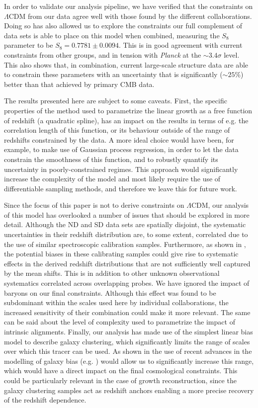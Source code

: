 \documentclass[a4paper,11pt]{article}
\newcommand{\lcdm}{$\Lambda$CDM\xspace}
\newcommand{\planck}{{\sl Planck}\xspace}
\newcommand{\northd}{ND\xspace}
\newcommand{\southd}{SD\xspace}
\begin{document}
    In order to validate our analysis pipeline, we have verified that the constraints on \lcdm from our data agree well with those found by the different collaborations. Doing so has also allowed us to explore the constraints our full complement of data sets is able to place on this model when combined, measuring the $S_8$ parameter to be $S_8=0.7781\pm 0.0094$. This is in good agreement with current constraints from other groups, and in tension with \planck at the $\sim3.4\sigma$ level. This also shows that, in combination, current large-scale structure data are able to constrain these parameters with an uncertainty that is significantly ($\sim25\%$) better than that achieved by primary CMB data.

    The results presented here are subject to some caveats. First, the specific properties of the method used to parametrize the linear growth as a free function of redshift (a quadratic spline), has an impact on the results in terms of e.g. the correlation length of this function, or its behaviour outside of the range of redshifts constrained by the data. A more ideal choice would have been, for example, to make use of Gaussian process regression, in order to let the data constrain the smoothness of this function, and to robustly quantify its uncertainty in poorly-constrained regimes. This approach would significantly increase the complexity of the model and most likely require the use of differentiable sampling methods, and therefore we leave this for future work. 
    
    Since the focus of this paper is not to derive constraints on \lcdm, our analysis of this model has overlooked a number of issues that should be explored in more detail. Although the \northd and \southd data sets are spatially disjoint, the systematic uncertainties in their redshift distribution are, to some extent, correlated due to the use of similar spectroscopic calibration samples. Furthermore, as shown in \cite{1906.09262}, the potential biases in these calibrating samples could give rise to systematic effects in the derived redshift distributions that are not sufficiently well captured by the mean shifts. This is in addition to other unknown observational systematics correlated across overlapping probes. We have ignored the impact of baryons on our final constraints. Although this effect was found to be subdominant within the scales used here by individual collaborations, the increased sensitivity of their combination could make it more relevant. The same can be said about the level of complexity used to parametrize the impact of intrinsic alignments. Finally, our analysis has made use of the simplest linear bias model to describe galaxy clustering, which significantly limits the range of scales over which this tracer can be used. As shown in \cite{2103.09820} the use of recent advances in the modelling of galaxy bias (e.g. \cite{1910.07097,2101.11014}) would allow us to significantly increase this range, which would have a direct impact on the final cosmological constraints. This could be particularly relevant in the case of growth reconstruction, since the galaxy clustering samples act as redshift anchors enabling a more precise recovery of the redshift dependence.
\end{document}
